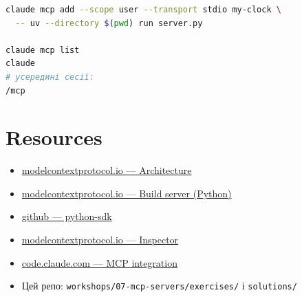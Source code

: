 \documentclass[11pt,a4paper]{article}
\begin{document}
\begin{lstlisting}[language=bash]
claude mcp add --scope user --transport stdio my-clock \
  -- uv --directory $(pwd) run server.py

claude mcp list
claude
# усередині сесії:
/mcp
\end{lstlisting}

\section{Resources}

\begin{itemize}
\item \href{https://modelcontextprotocol.io/docs/concepts/architecture}{modelcontextprotocol.io --- Architecture}
\item \href{https://modelcontextprotocol.io/docs/develop/build-server}{modelcontextprotocol.io --- Build server (Python)}
\item \href{https://github.com/modelcontextprotocol/python-sdk}{github --- python-sdk}
\item \href{https://modelcontextprotocol.io/docs/tools/inspector}{modelcontextprotocol.io --- Inspector}
\item \href{https://code.claude.com/docs/en/mcp}{code.claude.com --- MCP integration}
\item Цей репо: \texttt{workshops/07-mcp-servers/exercises/} і \texttt{solutions/}
\end{itemize}
\end{document}
